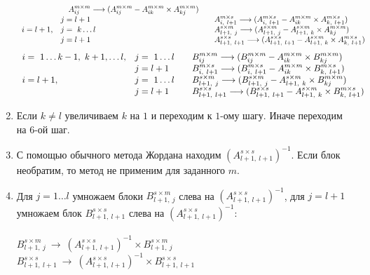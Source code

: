 \documentclass[14pt,a4paper, openany]{article}
\begin{document}
\begin{enumerate}
$$\begin{array}{l l l}
  & \quad A _{ij}^{m \times m} \longrightarrow (A _{ij}^{m \times m} - A _{ik}^{m \times m} \times  A _{kj}^{m \times m}) \\
 & j = l+1  &  \quad A _{i,\ l+1}^{m \times s} \longrightarrow (A _{i,\ l+1}^{m \times s} - A _{ik}^{m \times m} \times  A _{k,\ l+1}^{m \times s}) \\
i = l+1, &  j =\ k \ldots l
  & \quad A _{l+1,\ j}^{s \times m} \longrightarrow (A _{l+1,\ j}^{s \times m} - A _{l+1,\ k}^{s \times m} \times  A _{kj}^{m \times m}) \\
 & j = l+1  & \quad A _{l+1,\ l+1}^{s \times s} \longrightarrow (A _{l+1,\ l+1}^{s \times s} - A _{l+1,\ k}^{s \times m} \times  A _{k,\ l+1}^{m \times s})
\end{array}
$$
$$
\begin{array}{l l l}
i =\ 1 \ldots k-1,\ k+1, \ldots l, & j =\ 1 \ldots l
  & \quad B _{ij}^{m \times m} \longrightarrow (B _{ij}^{m \times m} - A _{ik}^{m \times m} \times  B _{kj}^{m \times m}) \\
 & j = l+1  &  \quad B _{i,\ l+1}^{m \times s} \longrightarrow (B _{i,\ l+1}^{m \times s} - A _{ik}^{m \times m} \times  B _{k,\ l+1}^{m \times s}) \\
i = l+1, &  j =\ 1 \ldots l
  & \quad B _{l+1,\ j}^{s \times m} \longrightarrow (B _{l+1,\ j}^{s \times m} - A _{l+1,\ k}^{s \times m} \times  B _{kj}^{m \times m}) \\
 & j = l+1  & \quad B _{l+1,\ l+1}^{s \times s} \longrightarrow (B _{l+1,\ l+1}^{s \times s} - A _{l+1,\ k}^{s \times m} \times  B _{k,\ l+1}^{m \times s}) 
\end{array}
$$
\item Если $ k \neq l $ увеличиваем $k$ на $1$ и переходим к $1$-ому шагу. Иначе переходим на $6$-ой шаг.
\item С помощью обычного метода Жордана находим $ (A_{l+1,\ l+1}^{s \times s})^{-1} $. Если блок необратим, то метод не применим для заданного $ m $.
\item Для $j = 1 \ldots l $ умножаем блоки $ B_{l+1,\ j}^{s \times m}$ слева на $(A_{l+1,\ l+1}^{s \times s})^{-1}$, для  $j=l+1$ умножаем блок $B_{l+1,\ l+1}^{s \times s}$ слева на $(A_{l+1,\ l+1}^{s \times s})^{-1} $: \\ \\ $ B_{l+1,\ j}^{s \times m} \ \longrightarrow \ (A_{l+1,\ l+1}^{s \times s})^{-1} \times B_{l+1,\ j}^{s \times m}$\\
$B_{l+1,\ l+1}^{s \times s} \ \longrightarrow \ (A_{l+1,\ l+1}^{s \times s})^{-1} \times B_{l+1,\ l+1}^{s \times s}$

\end{enumerate}
\end{document}
